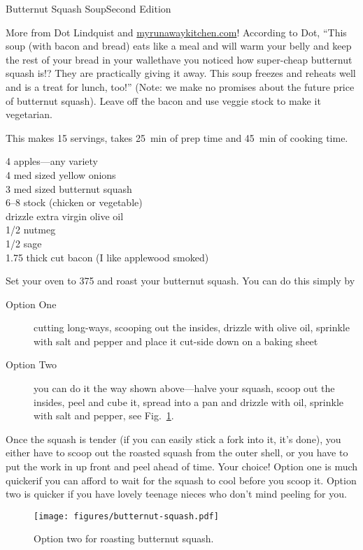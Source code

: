 \begin{entry}{Butternut Squash Soup}{Second Edition}

\begin{open}
  More from Dot Lindquist and \url{myrunawaykitchen.com}! According to Dot,
  ``This soup (with bacon and bread) eats like a meal and will warm your belly
  and keep the rest of your bread in your wallet\textellipsis have you noticed
  how super-cheap butternut squash is!?  They are practically giving it away.
  This soup freezes and reheats well and is a treat for lunch, too!'' (Note:
  we make no promises about the future price of butternut squash). Leave off the bacon and use veggie stock to make it vegetarian.

  This makes 15 servings, takes \SI{25}{\minute} of prep time and
  \SI{45}{\minute} of cooking time.
\end{open}
\begin{ingredients}
    4  apples---any variety\\
    4  med sized yellow onions\\
    3  med sized butternut squash\\
    \SIrange{6}{8}{\cup} stock (chicken or vegetable)\\
    drizzle  extra virgin olive oil\\
    \SI{1/2}{\teaspoon}  nutmeg\\
    \SI{1/2}{\teaspoon}  sage\\
    \SI{1.75}{\pound} thick cut bacon (I like applewood smoked)
\end{ingredients}
Set your oven to \SI{375}{\degreeF} and roast your butternut squash. You can
do this simply by
\begin{description}
    \item[Option One] cutting long-ways, scooping out the insides, drizzle with
    olive oil, sprinkle with salt and pepper and place it cut-side down on a
    baking sheet
    \item[Option Two] you can do it the way shown above---halve
    your squash, scoop out the insides, peel and cube it, spread into a pan and
    drizzle with oil, sprinkle with salt and pepper, see Fig.~\ref{fig:butternut-squash-two}.
\end{description}
Once the squash is tender (if you can easily stick a fork into it, it's done),
you either have to scoop out the roasted squash from the outer shell, or you
have to put the work in up front and peel ahead of time. Your choice! Option
one is much quicker\textellipsis if you can afford to wait for the squash to
cool before you scoop it. Option two is quicker if you have lovely teenage
nieces who don't mind peeling for you.
\begin{figure}
    \centering
    \texttt{[image: figures/butternut-squash.pdf]}
    \caption{Option two for roasting butternut squash.}
    \label{fig:butternut-squash-two}
\end{figure}


\end{entry}
